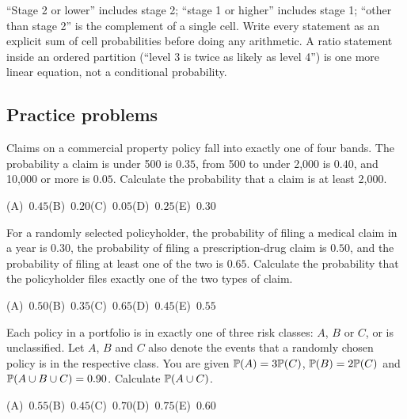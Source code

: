 \begin{trap}
``Stage 2 or lower'' includes stage 2; ``stage 1 or higher'' includes stage 1; ``other than
stage 2'' is the complement of a single cell. Write every statement as an explicit sum of
cell probabilities before doing any arithmetic. A ratio statement inside an ordered partition
(``level 3 is twice as likely as level 4'') is one more linear equation, not a conditional
probability.
\end{trap}

\subsection{Practice problems}

\begin{practice}
Claims on a commercial property policy fall into exactly one of four bands. The probability a
claim is under 500 is $0.35$, from 500 to under 2{,}000 is $0.40$, and 10{,}000 or more is
$0.05$. Calculate the probability that a claim is at least 2{,}000.

\smallskip\noindent (A)~$0.45$\hfill (B)~$0.20$\hfill (C)~$0.05$\hfill (D)~$0.25$\hfill (E)~$0.30$\hfill\mbox{}
\end{practice}

\begin{practice}
For a randomly selected policyholder, the probability of filing a medical claim in a year is
$0.30$, the probability of filing a prescription-drug claim is $0.50$, and the probability of
filing at least one of the two is $0.65$. Calculate the probability that the policyholder
files exactly one of the two types of claim.

\smallskip\noindent (A)~$0.50$\hfill (B)~$0.35$\hfill (C)~$0.65$\hfill (D)~$0.45$\hfill (E)~$0.55$\hfill\mbox{}
\end{practice}

\begin{practice}
Each policy in a portfolio is in exactly one of three risk classes: $A$, $B$ or $C$, or is
unclassified. Let $A$, $B$ and $C$ also denote the events that a randomly chosen policy is in
the respective class. You are given $\mathbb{P}(A) = 3\mathbb{P}(C)$, $\mathbb{P}(B) = 2\mathbb{P}(C)$ and
$\mathbb{P}(A \cup B \cup C) = 0.90$. Calculate $\mathbb{P}(A \cup C)$.

\smallskip\noindent (A)~$0.55$\hfill (B)~$0.45$\hfill (C)~$0.70$\hfill (D)~$0.75$\hfill (E)~$0.60$\hfill\mbox{}
\end{practice}

